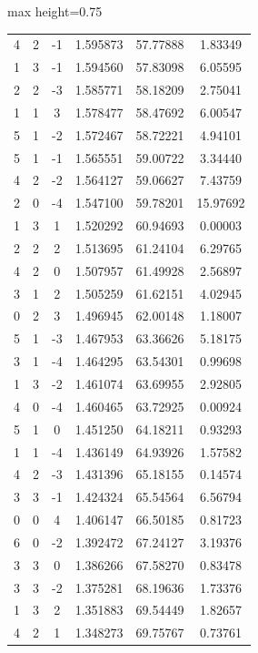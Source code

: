 \documentclass[twoside,a4paper,11pt,addpoints,answers]{exam}%
\begin{document}
\begin{center}
\begin{adjustbox}{max height=0.75\textwidth}
\begin{tabular}{cccccc}
4 & 2 & -1 &  1.595873 &  57.77888 &   1.83349 \\
1 & 3 & -1 &  1.594560 &  57.83098 &   6.05595 \\
2 & 2 & -3 &  1.585771 &  58.18209 &   2.75041 \\
1 & 1 &  3 &  1.578477 &  58.47692 &   6.00547 \\
5 & 1 & -2 &  1.572467 &  58.72221 &   4.94101 \\
5 & 1 & -1 &  1.565551 &  59.00722 &   3.34440 \\
4 & 2 & -2 &  1.564127 &  59.06627 &   7.43759 \\
2 & 0 & -4 &  1.547100 &  59.78201 &  15.97692 \\
1 & 3 &  1 &  1.520292 &  60.94693 &   0.00003 \\
2 & 2 &  2 &  1.513695 &  61.24104 &   6.29765 \\
4 & 2 &  0 &  1.507957 &  61.49928 &   2.56897 \\
3 & 1 &  2 &  1.505259 &  61.62151 &   4.02945 \\
0 & 2 &  3 &  1.496945 &  62.00148 &   1.18007 \\
5 & 1 & -3 &  1.467953 &  63.36626 &   5.18175 \\
3 & 1 & -4 &  1.464295 &  63.54301 &   0.99698 \\
1 & 3 & -2 &  1.461074 &  63.69955 &   2.92805 \\
4 & 0 & -4 &  1.460465 &  63.72925 &   0.00924 \\
5 & 1 &  0 &  1.451250 &  64.18211 &   0.93293 \\
1 & 1 & -4 &  1.436149 &  64.93926 &   1.57582 \\
4 & 2 & -3 &  1.431396 &  65.18155 &   0.14574 \\
3 & 3 & -1 &  1.424324 &  65.54564 &   6.56794 \\
0 & 0 &  4 &  1.406147 &  66.50185 &   0.81723 \\
6 & 0 & -2 &  1.392472 &  67.24127 &   3.19376 \\
3 & 3 &  0 &  1.386266 &  67.58270 &   0.83478 \\
3 & 3 & -2 &  1.375281 &  68.19636 &   1.73376 \\
1 & 3 &  2 &  1.351883 &  69.54449 &   1.82657 \\
4 & 2 &  1 &  1.348273 &  69.75767 &   0.73761 \\
\bottomrule
\end{tabular}
\end{adjustbox}
\end{center}
\end{document}
